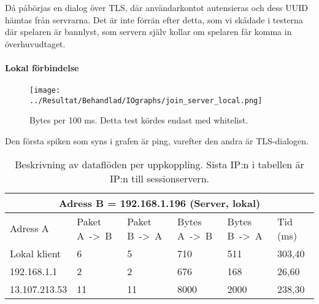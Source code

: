 \documentclass[journal,comsoc]{IEEEtran}
\begin{document}
Då påbörjas en dialog över TLS, där användarkontot autensieras och dess UUID hämtas från servrarna. Det är inte förrän efter detta, som vi skådade i testerna där spelaren är bannlyst, som servern själv kollar om spelaren får komma in överhuvudtaget. 

\paragraph{Lokal förbindelse}
\begin{figure} [H]
  \centering
  \texttt{[image: ../Resultat/Behandlad/IOgraphs/join\_server\_local.png]}
  \caption{Bytes per 100 ms. Detta test kördes endast med whitelist.}
  \label{fig:server:localconn}
\end{figure}
Den första spiken som syns i grafen är ping, varefter den andra är TLS-dialogen.
\begin{table} [H]
  \begin{center}
    \label{table:server:localconn}
    \begin{tabular}{ | m{1.5cm} |  m{1cm} | m{1cm}| m{1cm}|m{1cm}|m{0.75cm}| } 
      \hline
      \multicolumn{6}{|c|}{Adress B = 192.168.1.196 (Server, lokal)} \\
      \hline
      Adress A & Paket A~->~B & Paket B~->~A & Bytes A~->~B & Bytes B~->~A & Tid (ms) \\
      \hline
      Lokal klient & 6 & 5 & 710 & 511 & 303,40 \\
      \hline
      192.168.1.1 & 2 & 2 & 676 & 168 & 26,60 \\
      \hline   
      13.107.213.53 & 11 & 11 & 8000 & 2000 & 238,30 \\
      \hline 
    \end{tabular}
  \end{center}
  \caption{Beskrivning av dataflöden per uppkoppling. Sista IP:n i tabellen är IP:n till sessionservern.}
\end{table}
\end{document}
